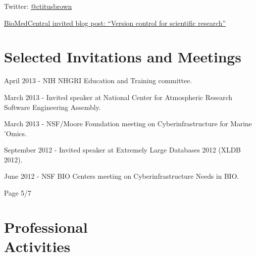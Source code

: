 \documentclass[margin,line]{resume}
\begin{document}
\begin{resume}
Twitter: \href{http://twitter.com/ctitusbrown}{@ctitusbrown}

\href{http://blogs.biomedcentral.com/bmcblog/2013/02/28/version-control-for-scientific-research/}{BioMedCentral invited blog post: ``Version control for scientific research''}

\section{\mysidestyle Selected Invitations and Meetings}

\begin{list1}

\item[] April 2013 - NIH NHGRI Education and Training committee.
\item[] March 2013 - Invited speaker at National Center for Atmospheric Research Software Engineering Assembly.
\item[] March 2013 - NSF/Moore Foundation meeting on Cyberinfrastructure for Marine 'Omics.
\item[] September 2012 - Invited speaker at Extremely Large Databases 2012 (XLDB 2012).
\item[] June 2012 - NSF BIO Centers meeting on Cyberinfrastructure Needs in BIO.

\end{list1}

\vspace{1cm}
{\centerline {Page 5/7}}

\newpage

    \section{\mysidestyle Professional\\Activities}


\end{resume}
\end{document}
